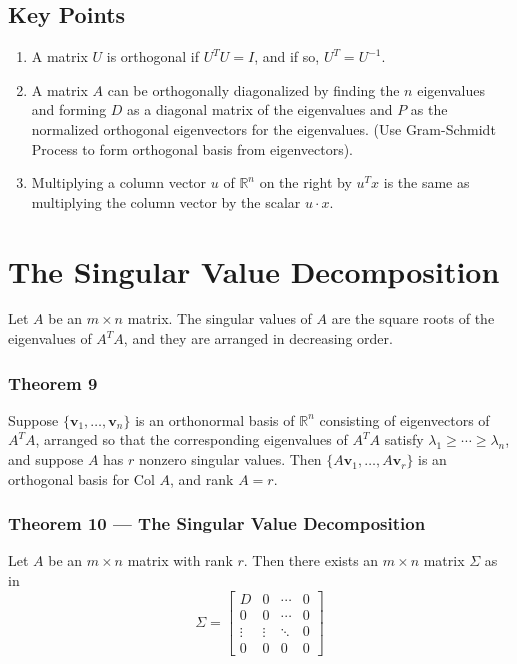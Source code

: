 \documentclass{article}
\begin{document}
\pagebreak

\subsection*{Key Points}
\begin{enumerate}
    \item A matrix $U$ is orthogonal if $U^T U = I$, and if so, $U^T=U^{-1}$.
    \item A matrix $A$ can be orthogonally diagonalized by finding the $n$ eigenvalues and forming
    $D$ as a diagonal matrix of the eigenvalues and $P$ as the normalized orthogonal eigenvectors
    for the eigenvalues. (Use Gram-Schmidt Process to form orthogonal basis from eigenvectors).
    \item Multiplying a column vector $u$ of $\mathbb{R}^n$ on the right by $u^T x$ is the same as
    multiplying the column vector by the scalar $u\cdot x$.
\end{enumerate}

\pagebreak

\section*{The Singular Value Decomposition}
Let $A$ be an $m\times n$ matrix. The singular values of $A$ are the square roots of the
eigenvalues of $A^T A$, and they are arranged in decreasing order.

\subsubsection*{Theorem 9}

Suppose $\{\mathbf{v}_1, \ldots, \mathbf{v}_n\}$ is an orthonormal basis of $\mathbb{R}^n$
consisting of eigenvectors of $A^T A$, arranged so that the corresponding eigenvalues of $A^T A$
satisfy $\lambda_1 \geq \cdots \geq \lambda_n$, and suppose $A$ has $r$ nonzero singular values.
Then $\{A\mathbf{v}_1, \ldots, A\mathbf{v}_r\}$ is an orthogonal basis for Col $A$, and rank $A=r$.

\subsubsection*{Theorem 10 --- The Singular Value Decomposition}

Let $A$ be an $m\times n$ matrix with rank $r$. Then there exists an $m\times n$ matrix $\Sigma$ as
in
\[\Sigma = \begin{bmatrix}
    D & 0 & \cdots & 0 \\ 0 & 0 & \cdots & 0 \\ \vdots & \vdots & \ddots & 0 \\ 0 & 0 & 0 & 0
\end{bmatrix}\]
\end{document}
